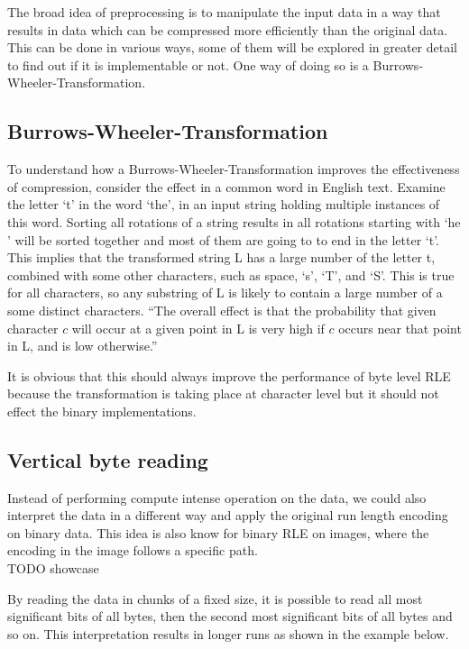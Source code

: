 The broad idea of preprocessing is to manipulate the input data in a way that results in data which can be compressed more efficiently than the original data. This can be done in various ways, some of them will be explored in greater detail to find out if it is implementable or not. One way of doing so is a Burrows-Wheeler-Transformation.

\subsection{Burrows-Wheeler-Transformation}
\label{ch:Analysis:sec:Improvements by Preprocessing:subSec:bwt}
\par{
To understand how a Burrows-Wheeler-Transformation improves the effectiveness of compression, consider the effect in a common word in English text. Examine the letter ‘t’ in the word ‘the’, in an input string holding multiple instances of this word.
Sorting all rotations of a string results in all rotations starting with ‘he ’ will be sorted together and most of them are going to to end in the letter ‘t’. This implies that the transformed string L has a large number of the letter t, combined with some other characters, such as space, ‘s’, ‘T’, and ‘S’. This is true for all characters, so any substring of L is likely to contain a large number of a some distinct characters. \enquote{The overall effect is that the probability that given character $c$ will occur at a given
point in L is very high if $c$ occurs near that point in L, and is low otherwise.} \cite{Burrows94}
}

\par{
It is obvious that this should always improve the performance of byte level RLE because the transformation is taking place at character level but it should not effect the binary implementations. 
}

\subsection{Vertical byte reading}
\label{ch:Analysis:sec:Improvements by Preprocessing:subSec:vertReading}
\par{
Instead of performing compute intense operation on the data, we could also interpret the data in a different way and apply the original run length encoding on binary data. This idea is also know for binary RLE on images, where the encoding in the image follows a specific path.\\
 TODO showcase}

\par{ By reading the data in chunks of a fixed size, it is possible to read all most significant bits of all bytes, then the second most significant bits of all bytes and so on. This interpretation results in longer runs as shown in the example below.
}

